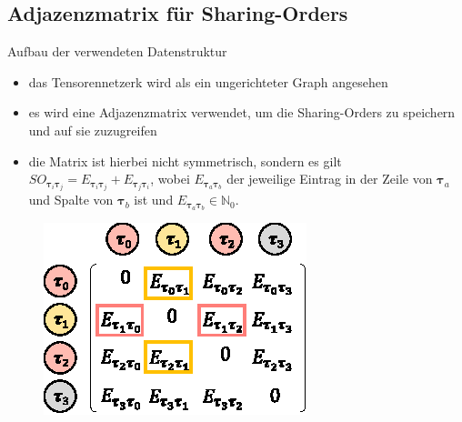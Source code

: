 \documentclass{beamer}
\newcommand{\tauB}{\bm{\tau}}
\begin{document}
\subsection{Adjazenzmatrix für Sharing-Orders}

\begin{frame}{Aufbau der verwendeten Datenstruktur}
	\begin{itemize}
		\item das Tensorennetzerk wird als ein ungerichteter Graph angesehen
		\item es wird eine Adjazenzmatrix verwendet, um die Sharing-Orders zu speichern und auf sie zuzugreifen
		\item die Matrix ist hierbei nicht symmetrisch,
		      sondern es gilt $SO_{\tauB_i \tauB_j} = E_{\tauB_i \tauB_j} + E_{\tauB_j \tauB_i}$, wobei $E_{\tauB_a \tauB_b}$ der jeweilige Eintrag in der Zeile von $\tauB_a$ und Spalte von $\tauB_b$ ist und $E_{\tauB_a \tauB_b} \in \mathbb{N}_0$.
	\end{itemize}
	\begin{figure}
		\includegraphics{figure_05_a}
	\end{figure}
\end{frame}
\end{document}
